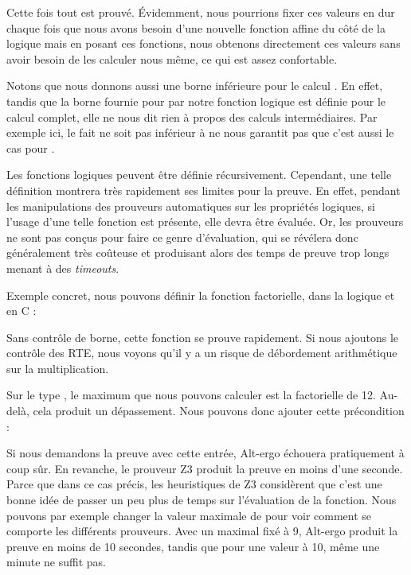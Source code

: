 Cette fois tout est prouvé. Évidemment, nous pourrions fixer ces valeurs en 
dur chaque fois que nous avons besoin d'une nouvelle fonction affine du côté de
la logique mais en posant ces fonctions, nous obtenons directement ces valeurs 
sans avoir besoin de les calculer nous même, ce qui est assez confortable.


Notons que nous donnons aussi une borne inférieure pour le calcul .
En effet, tandis que la borne fournie pour  par notre fonction logique
est définie pour le calcul complet, elle ne nous dit rien à propos des calculs
intermédiaires. Par exemple ici, le fait  ne soit pas inférieur
à  ne nous garantit pas que c'est aussi le cas pour
.





Les fonctions logiques peuvent être définie récursivement. Cependant, une telle
définition montrera très rapidement ses limites pour la preuve. En effet, 
pendant les manipulations des prouveurs automatiques sur les propriétés 
logiques, si l'usage d'une telle fonction est présente, elle devra être évaluée.
Or, les prouveurs ne sont pas conçus pour faire ce genre d'évaluation, qui se 
révélera donc généralement très coûteuse et produisant alors des temps de preuve
trop longs menant à des \textit{timeouts}.



Exemple concret, nous pouvons définir la fonction factorielle, dans la logique
et en C :






Sans contrôle de borne, cette fonction se prouve rapidement. Si nous ajoutons
le contrôle des RTE, nous voyons qu'il y a un risque de débordement
arithmétique sur la multiplication.



Sur le type , le maximum que nous pouvons calculer est la factorielle de 
12. Au-delà, cela produit un dépassement. Nous pouvons donc ajouter cette 
précondition :






Si nous demandons la preuve avec cette entrée, Alt-ergo échouera pratiquement à 
coup sûr. En revanche, le prouveur Z3 produit la preuve en moins d'une seconde.
Parce que dans ce cas précis, les heuristiques de Z3 considèrent que c'est une
bonne idée de passer un peu plus de temps sur l'évaluation de la fonction. Nous
pouvons par exemple changer la valeur maximale de  pour voir comment se 
comporte les différents prouveurs. Avec un  maximal fixé à 9, Alt-ergo produit
la preuve en moins de 10 secondes, tandis que pour une valeur à 10, même une 
minute ne suffit pas.



